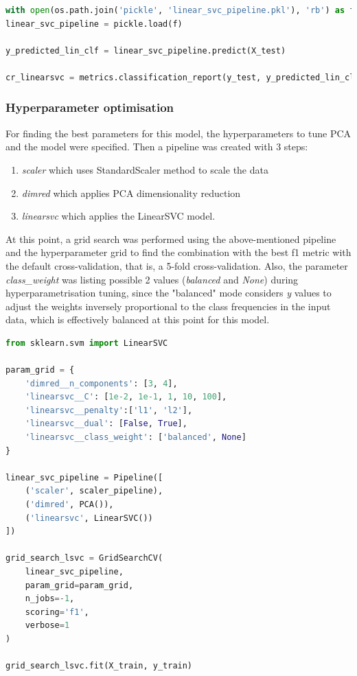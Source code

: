 \documentclass{article}
\begin{document}
\begin{lstlisting}[language=Python]
with open(os.path.join('pickle', 'linear_svc_pipeline.pkl'), 'rb') as f:
linear_svc_pipeline = pickle.load(f)
    
y_predicted_lin_clf = linear_svc_pipeline.predict(X_test)    

cr_linearsvc = metrics.classification_report(y_test, y_predicted_lin_clf, digits=4)
\end{lstlisting}

\subsubsection{Hyperparameter optimisation}
For finding the best parameters for this model, the hyperparameters to tune PCA and the model were specified. Then a pipeline was created with 3 steps:
\begin{enumerate}
\item \emph{scaler} which uses StandardScaler method to scale the data
\item \emph{dimred} which applies PCA dimensionality reduction
\item \emph{linearsvc} which applies the LinearSVC model.
\end{enumerate}

At this point, a grid search was performed using the above-mentioned pipeline and the hyperparameter grid to find the combination with the best f1 metric with the default cross-validation, that is, a 5-fold cross-validation. Also, the parameter \emph{class\_weight} was listing possible 2 values (\emph{balanced} and \emph{None}) during hyperparametrisation tuning, since the "balanced" mode considers \emph{y} values to adjust the weights inversely proportional to the class frequencies in the input data, which is effectively balanced at this point for this model.

\begin{lstlisting}[language=Python]
from sklearn.svm import LinearSVC

param_grid = {
    'dimred__n_components': [3, 4], 
    'linearsvc__C': [1e-2, 1e-1, 1, 10, 100],
    'linearsvc__penalty':['l1', 'l2'],
    'linearsvc__dual': [False, True],
    'linearsvc__class_weight': ['balanced', None]
}

linear_svc_pipeline = Pipeline([
    ('scaler', scaler_pipeline), 
    ('dimred', PCA()), 
    ('linearsvc', LinearSVC())
])

grid_search_lsvc = GridSearchCV(
    linear_svc_pipeline,
    param_grid=param_grid,
    n_jobs=-1,
    scoring='f1',
    verbose=1
)

grid_search_lsvc.fit(X_train, y_train)
\end{lstlisting}
\end{document}
